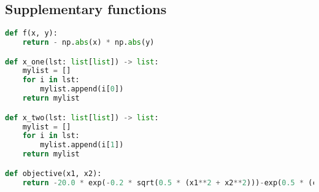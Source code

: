 \subsection{Supplementary functions}
\begin{lstlisting}[language=Python, label={lst:code2}, mathescape=true, breaklines=true]
def f(x, y): 
    return - np.abs(x) * np.abs(y)

def x_one(lst: list[list]) -> list:
    mylist = []
    for i in lst:
        mylist.append(i[0])
    return mylist

def x_two(lst: list[list]) -> list:
    mylist = []
    for i in lst:
        mylist.append(i[1])
    return mylist

def objective(x1, x2):
    return -20.0 * exp(-0.2 * sqrt(0.5 * (x1**2 + x2**2)))-exp(0.5 * (cos(2 * pi * x1)+cos(2 * pi * x2))) + e + 20

\end{lstlisting}
